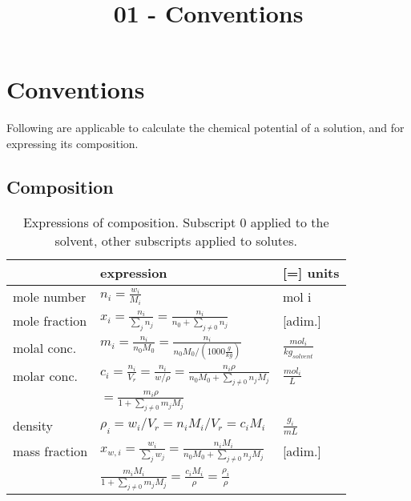 \documentclass[onecolumn]{article}
\begin{document}
\title{01 - Conventions}
\author{}
\date{}
\maketitle
\section{Conventions} %
Following are applicable to calculate the chemical potential of a solution, and for expressing its composition.
\label{sec:conventions}
\subsection{Composition}
\label{subsec:composition}
\begin{table}[h]
\begin{tabular}{|lll|}
\hline
		      & expression                                                                                    & [=] units                     \\
\hline
mole number   & $n_i = \frac{w_i}{M_i}$                                                                                   & mol i                         \\
mole fraction & $x_i = \frac{n_i}{\sum_j{n_j}} =  \frac{n_i}{n_0 + \sum_{j \neq 0}{n_j}}$                         & [adim.]                       \\
molal  conc.  & $m_i = \frac{n_i}{n_0 M_0} = \frac{n_i}{n_0 M_0 / \left(1000 \frac{g}{kg} \right)}$               & $\frac{mol_i} {kg_{solvent}}$ \\
molar  conc.  & $c_i = \frac{n_i}{V_r} = \frac{n_i}{w/\rho} = \frac{n_i \rho}{n_0 M_0 + \sum_{j\neq 0}{n_j M_j}}$ & $\frac{mol_i}{L}$\\
              & $= \frac{m_i \rho}{1 + \sum_{j\neq 0}{m_j M_j}}$     &       \\
density 	  & $\rho_i = w_i/V_r = n_i M_i/V_r = c_i M_i$			 &	$\frac{g_i}{mL}$ \\
mass fraction & $x_{w,i} = \frac{w_i}{\sum_j{w_j}} =  \frac{n_i M_i}{n_0 M_0 + \sum_{j \neq 0}{n_j M_j}}$                         & [adim.]                       \\
			  & $\frac{m_i M_i}{1+\sum_{j\neq0}{m_j M_j}} = \frac{c_i M_i}{\rho} = \frac{\rho_i}{\rho}$  &  \\
\hline
\end{tabular}
\caption{Expressions of composition. Subscript 0 applied to the solvent, other subscripts applied to solutes.}
\label{table:composition_expr}
\end{table}
\end{document}

